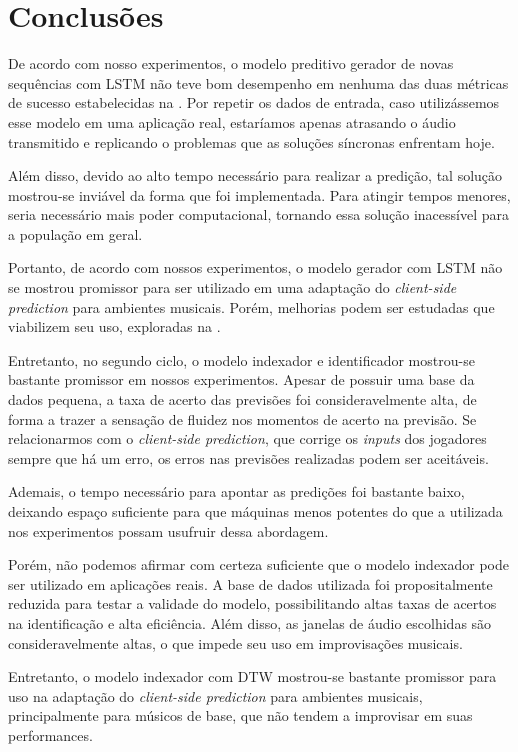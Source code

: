 \chapter{Conclusões}
\label{chap:conclusion}

De acordo com nosso experimentos, o modelo preditivo gerador de novas sequências com LSTM não teve bom desempenho em nenhuma das duas métricas de sucesso estabelecidas na . Por repetir os dados de entrada, caso utilizássemos esse modelo em uma aplicação real, estaríamos apenas atrasando o áudio transmitido e replicando o problemas que as soluções síncronas enfrentam hoje.

Além disso, devido ao alto tempo necessário para realizar a predição, tal solução mostrou-se inviável da forma que foi implementada. Para atingir tempos menores, seria necessário mais poder computacional, tornando essa solução inacessível para a população em geral.

Portanto, de acordo com nossos experimentos, o modelo gerador com LSTM não se mostrou promissor para ser utilizado em uma adaptação do \textit{client-side prediction} para ambientes musicais. Porém, melhorias podem ser estudadas que viabilizem seu uso, exploradas na .

Entretanto, no segundo ciclo, o modelo indexador e identificador mostrou-se bastante promissor em nossos experimentos. Apesar de possuir uma base da dados pequena, a taxa de acerto das previsões foi consideravelmente alta, de forma a trazer a sensação de fluidez nos momentos de acerto na previsão. Se relacionarmos com o \textit{client-side prediction}, que corrige os \textit{inputs} dos jogadores sempre que há um erro, os erros nas previsões realizadas podem ser aceitáveis.

Ademais, o tempo necessário para apontar as predições foi bastante baixo, deixando espaço suficiente para que máquinas menos potentes do que a utilizada nos experimentos possam usufruir dessa abordagem.

Porém, não podemos afirmar com certeza suficiente que o modelo indexador pode ser utilizado em aplicações reais. A base de dados utilizada foi propositalmente reduzida para testar a validade do modelo, possibilitando altas taxas de acertos na identificação e alta eficiência. Além disso, as janelas de áudio escolhidas são consideravelmente altas, o que impede seu uso em improvisações musicais.

Entretanto, o modelo indexador com DTW mostrou-se bastante promissor para uso na adaptação do \textit{client-side prediction} para ambientes musicais, principalmente para músicos de base, que não tendem a improvisar em suas performances.



